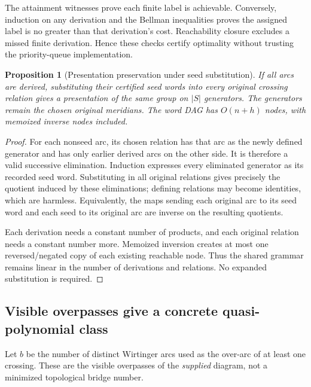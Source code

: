 \documentclass[11pt]{article}
\newtheorem{proposition}[theorem]{Proposition}
\theoremstyle{definition}
\theoremstyle{remark}
\begin{document}
The attainment witnesses prove each finite label is achievable. Conversely, induction on any derivation and the Bellman inequalities proves the assigned label is no greater than that derivation's cost. Reachability closure excludes a missed finite derivation. Hence these checks certify optimality without trusting the priority-queue implementation.

\begin{proposition}[Presentation preservation under seed substitution]
\label{prop:seediso}
If all arcs are derived, substituting their certified seed words into \emph{every} original crossing relation gives a presentation of the same group on $|S|$ generators. The generators remain the chosen original meridians. The word DAG has $O(n+h)$ nodes, with memoized inverse nodes included.
\end{proposition}
\begin{proof}
For each nonseed arc, its chosen relation has that arc as the newly defined generator and has only earlier derived arcs on the other side. It is therefore a valid successive elimination. Induction expresses every eliminated generator as its recorded seed word. Substituting in all original relations gives precisely the quotient induced by these eliminations; defining relations may become identities, which are harmless. Equivalently, the maps sending each original arc to its seed word and each seed to its original arc are inverse on the resulting quotients.

Each derivation needs a constant number of products, and each original relation needs a constant number more. Memoized inversion creates at most one reversed/negated copy of each existing reachable node. Thus the shared grammar remains linear in the number of derivations and relations. No expanded substitution is required.
\end{proof}

\subsection{Visible overpasses give a concrete quasi-polynomial class}
Let $b$ be the number of distinct Wirtinger arcs used as the over-arc of at least one crossing. These are the visible overpasses of the \emph{supplied} diagram, not a minimized topological bridge number.
\end{document}
